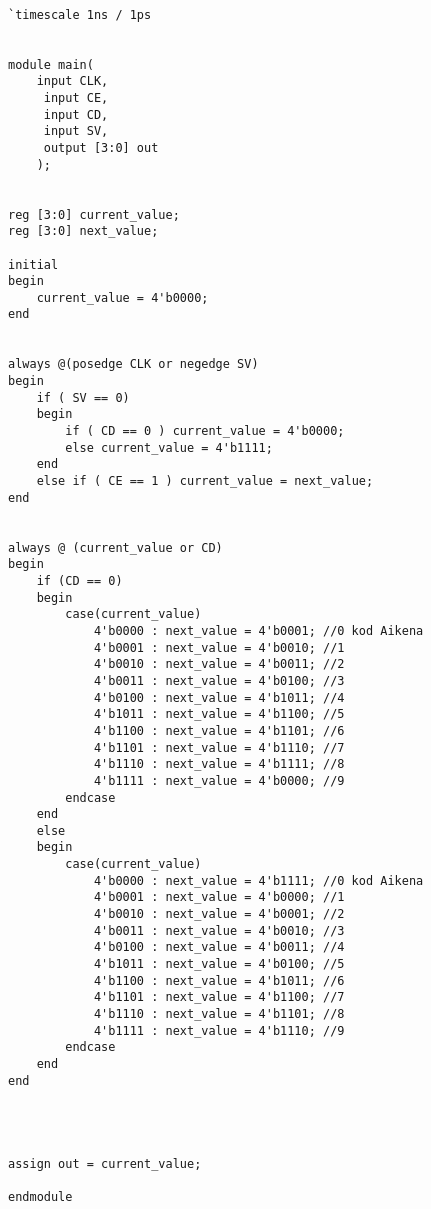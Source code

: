 \begin{lstlisting}

`timescale 1ns / 1ps


module main(
    input CLK,
	 input CE,
	 input CD,
	 input SV,
	 output [3:0] out
    );


reg [3:0] current_value;
reg [3:0] next_value;

initial
begin
	current_value = 4'b0000;
end


always @(posedge CLK or negedge SV)
begin
	if ( SV == 0) 
	begin
		if ( CD == 0 ) current_value = 4'b0000;
		else current_value = 4'b1111;
	end
	else if ( CE == 1 )	current_value = next_value;
end


always @ (current_value or CD)
begin
	if (CD == 0)
	begin
		case(current_value)
			4'b0000 : next_value = 4'b0001; //0 kod Aikena
			4'b0001 : next_value = 4'b0010; //1 
			4'b0010 : next_value = 4'b0011; //2
			4'b0011 : next_value = 4'b0100; //3
			4'b0100 : next_value = 4'b1011; //4
			4'b1011 : next_value = 4'b1100; //5
			4'b1100 : next_value = 4'b1101; //6
			4'b1101 : next_value = 4'b1110; //7
			4'b1110 : next_value = 4'b1111; //8
			4'b1111 : next_value = 4'b0000; //9
		endcase
	end
	else
	begin
		case(current_value)
			4'b0000 : next_value = 4'b1111; //0 kod Aikena
			4'b0001 : next_value = 4'b0000; //1 
			4'b0010 : next_value = 4'b0001; //2
			4'b0011 : next_value = 4'b0010; //3
			4'b0100 : next_value = 4'b0011; //4
			4'b1011 : next_value = 4'b0100; //5
			4'b1100 : next_value = 4'b1011; //6
			4'b1101 : next_value = 4'b1100; //7
			4'b1110 : next_value = 4'b1101; //8
			4'b1111 : next_value = 4'b1110; //9
		endcase
	end
end




assign out = current_value;

endmodule

\end{lstlisting}